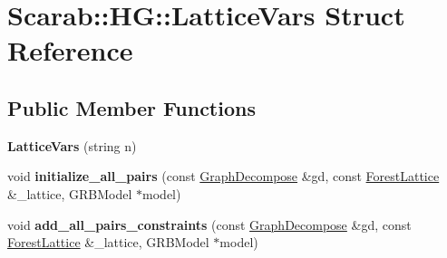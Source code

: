 \hypertarget{structScarab_1_1HG_1_1LatticeVars}{
\section{Scarab::HG::LatticeVars Struct Reference}
\label{structScarab_1_1HG_1_1LatticeVars}
}
\subsection*{Public Member Functions}
\begin{DoxyCompactItemize}
\item 
\hypertarget{structScarab_1_1HG_1_1LatticeVars_a22dc8ef683d47635b8e55adf3520a811}{
{\bfseries LatticeVars} (string n)}
\label{structScarab_1_1HG_1_1LatticeVars_a22dc8ef683d47635b8e55adf3520a811}

\item 
\hypertarget{structScarab_1_1HG_1_1LatticeVars_a2b1a31d5b8d9673c7c473f28c2e02db9}{
void {\bfseries initialize\_\-all\_\-pairs} (const \hyperlink{classGraphDecompose}{GraphDecompose} \&gd, const \hyperlink{classForestLattice}{ForestLattice} \&\_\-lattice, GRBModel $\ast$model)}
\label{structScarab_1_1HG_1_1LatticeVars_a2b1a31d5b8d9673c7c473f28c2e02db9}

\item 
\hypertarget{structScarab_1_1HG_1_1LatticeVars_a769802ee94dab4d0c8a7956fb861efac}{
void {\bfseries add\_\-all\_\-pairs\_\-constraints} (const \hyperlink{classGraphDecompose}{GraphDecompose} \&gd, const \hyperlink{classForestLattice}{ForestLattice} \&\_\-lattice, GRBModel $\ast$model)}
\label{structScarab_1_1HG_1_1LatticeVars_a769802ee94dab4d0c8a7956fb861efac}

\end{DoxyCompactItemize}
